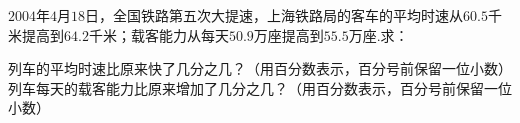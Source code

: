 $2004$年$4$月$18$日，全国铁路第五次大提速，上海铁路局的客车的平均时速从$60.5$千米提高到$64.2$千米；载客能力从每天$50.9$万座提高到$55.5$万座.求：

\begin{subquestions}
    \subquestion 列车的平均时速比原来快了几分之几？（用百分数表示，百分号前保留一位小数）
    \subquestion 列车每天的载客能力比原来增加了几分之几？（用百分数表示，百分号前保留一位小数）
\end{subquestions}